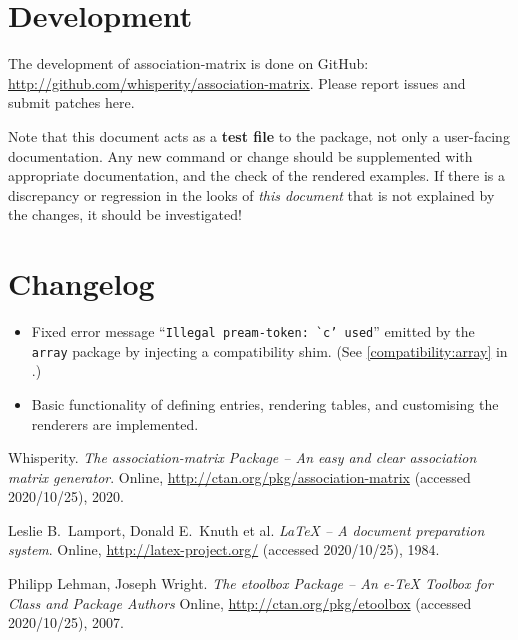\documentclass{article}
\begin{document}
\section{Development}
The development of \textsf{association-matrix} is done on GitHub: \url{http://github.com/whisperity/association-matrix}.
Please report issues and submit patches here.

Note that this document acts as a \textbf{test file} to the package, not only a user-facing documentation.
Any new command or change should be supplemented with appropriate documentation, and the check of the rendered examples.
If there is a discrepancy or regression in the looks of \emph{this document} that is not explained by the changes, it should be investigated!

\section{Changelog}\label{changelog}
\begin{itemize}
    \item Fixed error message ``\texttt{Illegal pream-token: \`{}c' used}'' emitted by the \texttt{array} package by injecting a compatibility shim.
        (See \cref{compatibility:array} in .)
\end{itemize}

\begin{itemize}
    \item Basic functionality of defining entries, rendering tables, and customising the renderers are implemented.
\end{itemize}

\begin{thebibliography}{3}
Whisperity. \textit{The \textsf{association-matrix} Package -- An easy and clear association matrix generator}.
Online, \url{http://ctan.org/pkg/association-matrix} (accessed 2020/10/25), 2020.

Leslie B.\ Lamport, Donald E.\ Knuth et al.
\textit{\LaTeX{} -- A document preparation system}.
Online, \url{http://latex-project.org/} (accessed 2020/10/25), 1984.

Philipp Lehman, Joseph Wright.
\textit{The \textsf{etoolbox} Package -- An e-\TeX{} Toolbox for Class and Package Authors}
Online, \url{http://ctan.org/pkg/etoolbox} (accessed 2020/10/25), 2007.
\end{thebibliography}
\end{document}
